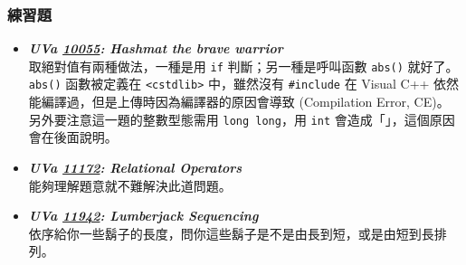 \subsubsection*{練習題}
\begin{itemize}[label={\Checkmark}]
\item \textbf{\textit{UVa \href{http://uva.onlinejudge.org/external/100/10055.html}{10055}: Hashmat the brave warrior}}\\
取絕對值有兩種做法，一種是用 \lstinline!if! 判斷；另一種是呼叫函數 \lstinline!abs()! 就好了。\lstinline!abs()! 函數被定義在 \lstinline!<cstdlib>! 中，雖然沒有 \lstinline!#include! 在 Visual C++ 依然能編譯過，但是上傳時因為編譯器的原因會導致 (Compilation Error, CE)。\\另外要注意這一題的整數型態需用 \lstinline!long long!，用 \lstinline!int! 會造成「」，這個原因會在後面說明。
\item \textbf{\textit{UVa \href{http://uva.onlinejudge.org/external/111/11172.html}{11172}: Relational Operators}}\\
能夠理解題意就不難解決此道問題。
\item \textbf{\textit{UVa \href{http://uva.onlinejudge.org/external/119/11942.html}{11942}: Lumberjack Sequencing}}\\
依序給你一些鬍子的長度，問你這些鬍子是不是由長到短，或是由短到長排列。
\end{itemize}